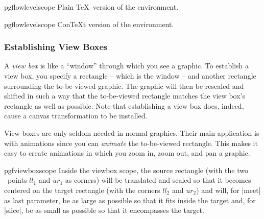 \begin{plainenvironment}{{pgflowlevelscope}}
    Plain \TeX\ version of the environment.
\end{plainenvironment}

\begin{contextenvironment}{{pgflowlevelscope}}
    Con\TeX t version of the environment.
\end{contextenvironment}


\subsubsection{Establishing View Boxes}
\label{section-base-view}

A \emph{view box} is like a ``window'' through which you see a graphic. To
establish a view box, you specify a rectangle -- which is the window -- and
another rectangle surrounding the to-be-viewed graphic. The graphic will then
be rescaled and shifted in such a way that the to-be-viewed rectangle matches
the view box's rectangle as well as possible. Note that establishing a view box
does, indeed, cause a canvas transformation to be installed.

View boxes are only seldom needed in normal graphics. Their main application is
with animations since you can \emph{animate} the to-be-viewed rectangle. This
makes it easy to create animations in which you zoom in, zoom out, and pan a
graphic.

\begin{environment}{{pgfviewboxscope}}
    Inside the viewbox scope, the source rectangle (with the two \pgfname\
    points $ll_1$ and $ur_1$ as corners) will be translated and scaled so that
    it becomes centered on the target rectangle (with the corners $ll_2$ and
    $ur_2$) and will, for |meet| as last parameter, be as large as possible so
    that it fits inside the target and, for |slice|, be as small as possible so
    that it encompasses the target.
\begin{codeexample}[]
\end{codeexample}
\begin{codeexample}[]
\end{codeexample}
\end{environment}

